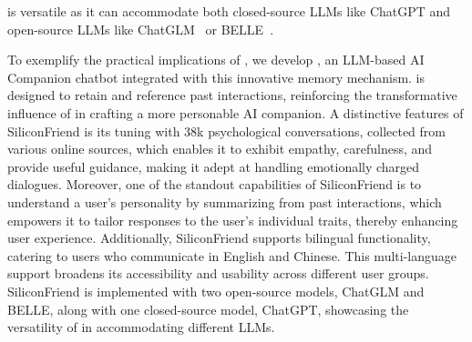 \method is versatile as it can accommodate both closed-source LLMs like ChatGPT and open-source LLMs like ChatGLM~\citep{zeng2022glm} or BELLE~\citep{BELLE}.

To exemplify the practical implications of \method, we develop \chatbot, an LLM-based AI Companion chatbot integrated with this innovative memory mechanism. 
\chatbot is designed to retain and reference past interactions, reinforcing the transformative influence of \method in crafting a more personable AI companion.
A distinctive features of SiliconFriend is its tuning with 38k psychological conversations, collected from various online sources, which enables it to exhibit empathy, carefulness, and provide useful guidance, making it adept at handling emotionally charged dialogues. 
Moreover, one of the standout capabilities of SiliconFriend is to understand a user's personality by summarizing from past interactions, which empowers it to tailor responses to the user's individual traits, thereby enhancing user experience.
Additionally, SiliconFriend supports bilingual functionality, catering to users who communicate in English and Chinese. This multi-language support broadens its accessibility and usability across different user groups. 
SiliconFriend is implemented with two open-source models, ChatGLM and BELLE, along with one closed-source model, ChatGPT, showcasing the versatility of \method in accommodating different LLMs.

